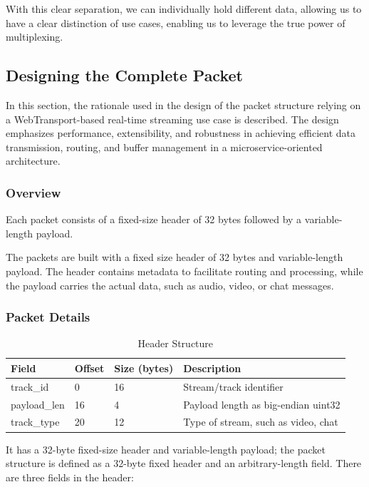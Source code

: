 With this clear separation, we can individually hold different data, allowing us to have a clear distinction of use cases, enabling us to leverage the true power of multiplexing.


\subsection{Designing the Complete Packet}

In this section, the rationale used in the design of the packet structure relying on a WebTransport-based real-time streaming use case is described. The design emphasizes performance, extensibility, and robustness in achieving efficient data transmission, routing, and buffer management in a microservice-oriented architecture.

\subsubsection{Overview}
Each packet consists of a fixed-size header of 32 bytes followed by a variable-length payload.

The packets are built with a fixed size header of 32 bytes and variable-length payload. The header contains metadata to facilitate routing and processing, while the payload carries the actual data, such as audio, video, or chat messages.


\subsubsection{Packet Details}

\begin{table}[h]
\centering
\begin{tabular}{|l|l|l|l|}
\hline
\textbf{Field} & \textbf{Offset} & \textbf{Size (bytes)} & \textbf{Description} \\
\hline
track\_id & 0 & 16 & Stream/track identifier \\
payload\_len & 16 & 4 & Payload length as big-endian uint32 \\
track\_type & 20 & 12 & Type of stream, such as video, chat \\
\hline
\end{tabular}
\caption{Header Structure}
\label{tab:header_structure}
\end{table}

It has a 32-byte fixed-size header and variable-length payload; the packet structure is defined as a 32-byte fixed header and an arbitrary-length field. There are three fields in the header:

